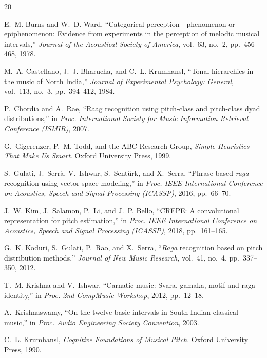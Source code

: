 \documentclass[11pt,a4paper]{article}
\begin{document}
{%
{\small\setlength{\itemsep}{0pt}\setlength{\parskip}{0pt}
\renewcommand{\refname}{References}
\begin{thebibliography}{20}

E.~M. Burns and W.~D. Ward, ``Categorical perception---phenomenon or epiphenomenon: Evidence from experiments in the perception of melodic musical intervals,'' \textit{Journal of the Acoustical Society of America}, vol.~63, no.~2, pp.~456--468, 1978.

M.~A. Castellano, J.~J. Bharucha, and C.~L. Krumhansl, ``Tonal hierarchies in the music of North India,'' \textit{Journal of Experimental Psychology: General}, vol.~113, no.~3, pp.~394--412, 1984.

P.~Chordia and A.~Rae, ``Raag recognition using pitch-class and pitch-class dyad distributions,'' in \textit{Proc. International Society for Music Information Retrieval Conference (ISMIR)}, 2007.

G.~Gigerenzer, P.~M. Todd, and the ABC Research Group, \textit{Simple Heuristics That Make Us Smart}. Oxford University Press, 1999.

S.~Gulati, J.~Serr\`a, V.~Ishwar, S.~Sent\"urk, and X.~Serra, ``Phrase-based \textit{raga} recognition using vector space modeling,'' in \textit{Proc. IEEE International Conference on Acoustics, Speech and Signal Processing (ICASSP)}, 2016, pp.~66--70.

J.~W. Kim, J.~Salamon, P.~Li, and J.~P. Bello, ``CREPE: A convolutional representation for pitch estimation,'' in \textit{Proc. IEEE International Conference on Acoustics, Speech and Signal Processing (ICASSP)}, 2018, pp.~161--165.

G.~K. Koduri, S.~Gulati, P.~Rao, and X.~Serra, ``\textit{Raga} recognition based on pitch distribution methods,'' \textit{Journal of New Music Research}, vol.~41, no.~4, pp.~337--350, 2012.

T.~M. Krishna and V.~Ishwar, ``Carnatic music: Svara, gamaka, motif and raga identity,'' in \textit{Proc. 2nd CompMusic Workshop}, 2012, pp.~12--18.

A.~Krishnaswamy, ``On the twelve basic intervals in South Indian classical music,'' in \textit{Proc. Audio Engineering Society Convention}, 2003.

C.~L. Krumhansl, \textit{Cognitive Foundations of Musical Pitch}. Oxford University Press, 1990.


\end{thebibliography}}}
\end{document}
